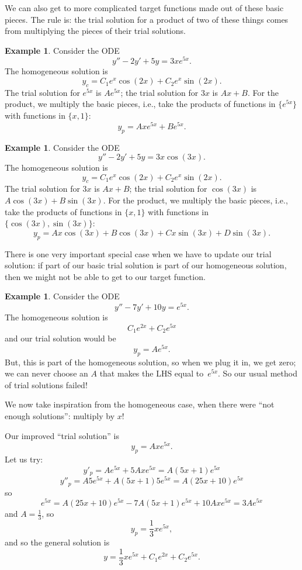 \documentclass[12pt]{amsart}
\numberwithin{equation}{section}
\theoremstyle{plain} %
\theoremstyle{definition}
\newtheorem{ex}[equation]{Example}
\theoremstyle{remark}
\begin{document}
We can also get to more complicated target functions made out of these basic pieces. The rule is:
the trial solution for a product of two of these things comes from multiplying the pieces of their trial solutions.

\begin{ex} Consider the ODE
\[ y'' - 2y' + 5y = 3x e^{5x}.\]
The homogeneous solution is
\[ y_c =C_1 e^{x}\cos(2x) + C_2 e^{x}\sin(2x).\]
The trial solution for $e^{5x}$ is $Ae^{5x}$; the trial solution for $3x$ is $A x + B$. For the product, we multiply the basic pieces, i.e., take the products of functions in $\{e^{5x}\}$ with functions in $\{x,1\}$:
\[ y_p = A x e^{5x} + B e^{5x} .\]
\end{ex}

\begin{ex} Consider the ODE
\[ y'' - 2y' + 5y = 3x \cos(3x).\]
The homogeneous solution is
\[ y_c= C_1 e^{x}\cos(2x) + C_2 e^{x}\sin(2x).\]
The trial solution for $3x$ is $A x + B$; the trial solution for $\cos(3x)$ is $A \cos(3x) + B \sin(3x)$. For the product, we multiply the basic pieces, i.e., take the products of functions in $\{x,1\}$ with functions in $\{\cos(3x),\sin(3x)\}$:
\[ y_p = A x \cos(3x) + B \cos(3x) + C x \sin(3x) + D \sin(3x) .\]
\end{ex}

There is one very important special case when we have to update our trial solution: if part of our basic trial solution is part of our homogeneous solution, then we might not be able to get to our target function.

\begin{ex} Consider the ODE
\[ y'' - 7y' + 10y = e^{5x}.\]
The homogeneous solution is 
\[ C_1 e^{2x} + C_2 e^{5x}\]
and our trial solution would be 
\[ y_p = A e^{5x}.\]
But, this is part of the homogeneous solution, so when we plug it in, we get zero; we can never choose an $A$ that makes the LHS equal to~$e^{5x}$. So our usual method of trial solutions failed!

We now take inspiration from the homogeneous case, when there were ``not enough solutions'': multiply by $x$!

Our improved ``trial solution'' is 
\[ y_p = A x e^{5x}.\]
Let us try:
\[ y'_p = A e^{5x} + 5A x e^{5x} = A (5x+1) e^{5x}\]
\[y''_p = A 5e^{5x} + A (5x+1)5e^{5x} = A(25x+10)e^{5x}\]
so 
\[e^{5x} = A(25x+10)e^{5x} - 7 A (5x+1) e^{5x} + 10 A x e^{5x} = 3A e^{5x}\]
and $A=\frac{1}{3}$, so
\[ y_p = \frac{1}{3} x e^{5x},\]
and so the general solution is
\[ y= \frac{1}{3} x e^{5x} + C_1 e^{2x} + C_2 e^{5x}.\]
\end{ex}
\end{document}
